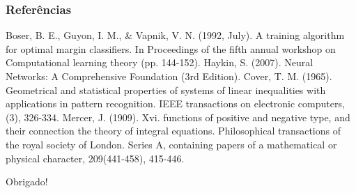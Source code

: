 \documentclass{beamer}
\begin{document}
\begin{frame}
\frametitle{Referências}
\footnotesize{
\begin{thebibliography}{99} %
Boser, B. E., Guyon, I. M., \& Vapnik, V. N. (1992, July). A training algorithm for optimal margin classifiers. In Proceedings of the fifth annual workshop on Computational learning theory (pp. 144-152).
Haykin, S. (2007). Neural Networks: A Comprehensive Foundation (3rd Edition).
Cover, T. M. (1965). Geometrical and statistical properties of systems of linear inequalities with applications in pattern recognition. IEEE transactions on electronic computers, (3), 326-334.
Mercer, J. (1909). Xvi. functions of positive and negative type, and their connection the theory of integral equations. Philosophical transactions of the royal society of London. Series A, containing papers of a mathematical or physical character, 209(441-458), 415-446.

\end{thebibliography}
}
\end{frame}


\begin{frame}
\Huge{\centerline{Obrigado!}}
\end{frame}

\end{document}
